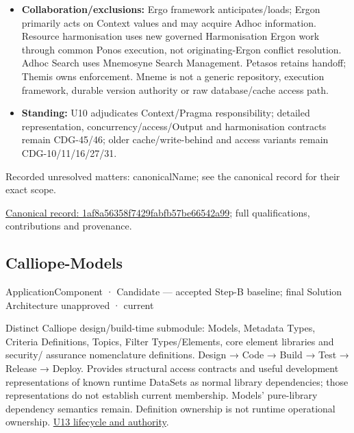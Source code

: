 \begin{itemize}
\item \textbf{Collaboration/exclusions:} Ergo framework anticipates/loads; Ergon primarily
  acts on Context values and may acquire Adhoc information. Resource harmonisation
  uses new governed Harmonisation Ergon work through common Ponos execution, not
  originating-Ergon conflict resolution. Adhoc Search uses Mnemosyne Search Management.
  Petasos retains handoff; Themis owns enforcement. Mneme is not a generic repository,
  execution framework, durable version authority or raw database/cache access path.

\item \textbf{Standing:} U10 adjudicates Context/Pragma responsibility; detailed representation,
  concurrency/access/Output and harmonisation contracts remain CDG-45/46; older
  cache/write-behind and access variants remain CDG-10/11/16/27/31.

\end{itemize}

{\small Recorded unresolved matters: canonicalName; see the canonical record for their exact scope.}\par
{\footnotesize \href{../../../../continuum/application/application-component/1af8a56358f7429fabfb57be66542a99.md}{Canonical record: 1af8a56358f7429fabfb57be66542a99}; full qualifications, contributions and provenance.}\par
\subsection{Calliope-Models}

\label{element:307b3440a507403f8bc214d290bffb6a}
{\small ApplicationComponent · Candidate — accepted Step-B baseline; final Solution Architecture unapproved · current}\par

Distinct Calliope design/build-time submodule: Models, Metadata Types, Criteria
Definitions, Topics, Filter Types/Elements, core element libraries and security/
assurance nomenclature definitions. Design → Code → Build → Test → Release → Deploy.
Provides structural access contracts and useful development representations of
known runtime DataSets as normal library dependencies; those representations do
not establish current membership. Models' pure-library dependency semantics remain.
Definition ownership is not runtime operational ownership. \hyperref[element:307b3440a507403f8bc214d290bffb6a]{U13 lifecycle and authority}.


